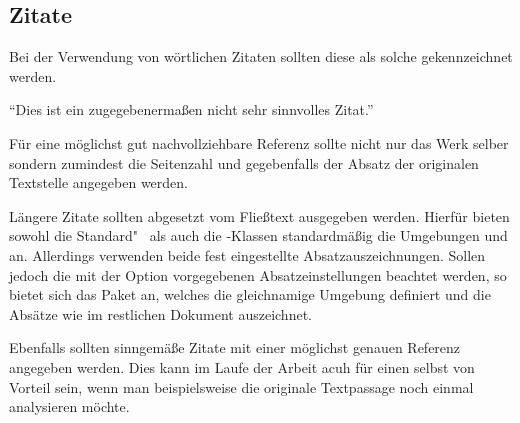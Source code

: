 \documentclass[%
  english,ngerman,%
  geometry=no,DIV=12,automark,%
]{tudscrartcl}
\begin{document}
\begin{refsection}
\begin{Trunk+}
\section{Zitate}
Bei der Verwendung von wörtlichen Zitaten sollten diese als solche 
gekennzeichnet werden.
\end{Trunk+}
\begin{Trunk*}
\enquote{Dies ist ein zugegebenermaßen nicht sehr sinnvolles Zitat.}
\cite[58]{hanisch14}
\end{Trunk*}
\begin{Trunk+}
Für eine möglichst gut nachvollziehbare Referenz sollte nicht nur 
das Werk selber sondern zumindest die Seitenzahl und gegebenfalls 
der Absatz der originalen Textstelle angegeben werden. 
\end{Trunk+}
%
Längere Zitate sollten abgesetzt vom Fließtext ausgegeben werden. Hierfür 
bieten sowohl die Standard"~ als auch die \KOMAScript-Klassen standardmäßig 
die Umgebungen  und  an. Allerdings 
verwenden beide fest eingestellte Absatzauszeichnungen. Sollen jedoch die 
mit der Option  vorgegebenen Absatzeinstellungen beachtet 
werden, so bietet sich das Paket  an, welches die gleichnamige 
Umgebung definiert und die Absätze wie im restlichen Dokument auszeichnet.
%
\begin{Preamble}
\usepackage{quoting}

\end{Preamble}
%
\begin{Trunk*}
\end{Trunk*}
\begin{Trunk+}
Ebenfalls sollten sinngemäße Zitate mit einer möglichst genauen Referenz 
angegeben werden. Dies kann im Laufe der Arbeit acuh für einen selbst von 
Vorteil sein, wenn man beispielsweise die originale Textpassage noch 
einmal analysieren möchte.

\end{Trunk+}
\begin{quoting}[rightmargin=0pt]
\makeatletter
\let\markboth\@gobbletwo
\let\markright\@gobble
\makeatother
\vspace*{-\baselineskipglue}
\printbibliography
\end{quoting}
\end{refsection}
\end{document}

